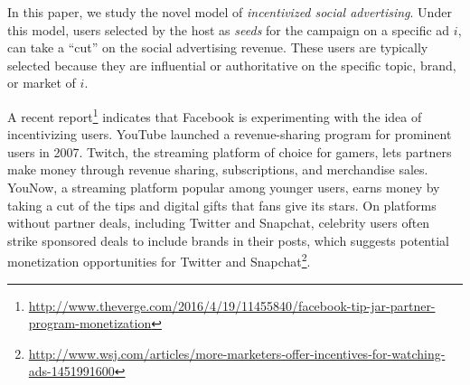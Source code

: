 



\enlargethispage{2\baselineskip}
 In this paper, we study the novel model of \emph{incentivized social advertising}. Under this model, users selected by the host as  \emph{seeds} for the campaign on a specific ad $i$, can take a ``cut'' on the social advertising revenue. These users are typically selected because they are influential or authoritative on the specific topic, brand, or market of $i$.

A recent report\footnote{\scriptsize \url{http://www.theverge.com/2016/4/19/11455840/facebook-tip-jar-partner-program-monetization}} indicates that Facebook is experimenting with the idea of incentivizing users. YouTube launched a revenue-sharing program for prominent users in 2007. Twitch, the streaming platform of choice for gamers, lets partners make money through revenue sharing, subscriptions, and merchandise sales. YouNow, a streaming platform popular among younger users, earns money by taking a cut of the tips and digital gifts that fans give its stars. On platforms without partner deals, including Twitter and Snapchat, celebrity users often strike sponsored deals to include brands in their posts, which suggests potential monetization opportunities for Twitter and Snapchat\footnote{\scriptsize \url{http://www.wsj.com/articles/more-marketers-offer-incentives-for-watching-ads-1451991600}}.

